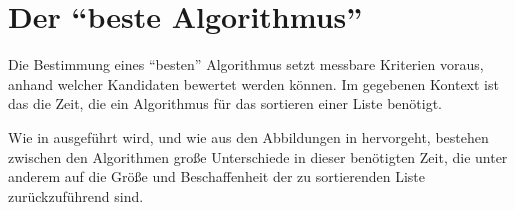 
\section{Der \enquote{beste Algorithmus}}
\label{sec:best-algo}

Die Bestimmung eines \enquote{besten} Algorithmus setzt messbare Kriterien voraus, anhand welcher Kandidaten bewertet werden können. Im gegebenen Kontext ist das die Zeit, die ein Algorithmus für das sortieren einer Liste benötigt.

Wie in  ausgeführt wird, und wie aus den Abbildungen in  hervorgeht, bestehen zwischen den Algorithmen große Unterschiede in dieser benötigten Zeit, die unter anderem auf die Größe und Beschaffenheit der zu sortierenden Liste zurückzuführend sind.

